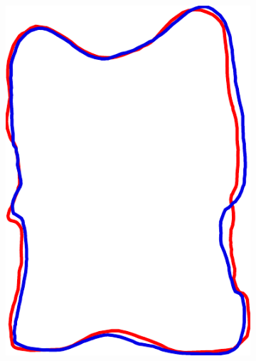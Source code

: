 \documentclass[pdftex,12pt,a4paper]{report}
\begin{document}
\begin{figure}[h]
\begin{subfigure}[b]{0.24\textwidth}
		\includegraphics[width=.9\linewidth]{img/registration/single-affine.pdf}
	\end{subfigure}
	\begin{subfigure}[b]{0.24\textwidth}
		\centering

\end{subfigure}
\end{figure}
\end{document}
